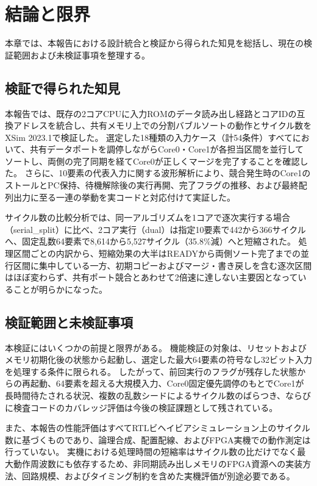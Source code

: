 \chapter{結論と限界}\label{chap:7}

本章では、本報告における設計統合と検証から得られた知見を総括し、現在の検証範囲および未検証事項を整理する。

\section{検証で得られた知見}\label{sec:7-1}

本報告では、既存の2コアCPUに入力ROMのデータ読み出し経路とコアIDの互換アドレスを統合し、共有メモリ上での分割バブルソートの動作とサイクル数をXSim 2023.1で検証した。
選定した18種類の入力ケース（計54条件）すべてにおいて、共有データポートを調停しながらCore0・Core1が各担当区間を並行してソートし、両側の完了同期を経てCore0が正しくマージを完了することを確認した。
さらに、10要素の代表入力に関する波形解析により、競合発生時のCore1のストールとPC保持、待機解除後の実行再開、完了フラグの推移、および最終配列出力に至る一連の挙動を実コードと対応付けて実証した。

サイクル数の比較分析では、同一アルゴリズムを1コアで逐次実行する場合（serial\_split）に比べ、2コア実行（dual）は指定10要素で442から366サイクルへ、固定乱数64要素で8,614から5,527サイクル（35.8\%減）へと短縮された。
処理区間ごとの内訳から、短縮効果の大半はREADYから両側ソート完了までの並行区間に集中している一方、初期コピーおよびマージ・書き戻しを含む逐次区間はほぼ変わらず、共有ポート競合とあわせて2倍速に達しない主要因となっていることが明らかになった。

\section{検証範囲と未検証事項}\label{sec:7-2}

本検証にはいくつかの前提と限界がある。
機能検証の対象は、リセットおよびメモリ初期化後の状態から起動し、選定した最大64要素の符号なし32ビット入力を処理する条件に限られる。
したがって、前回実行のフラグが残存した状態からの再起動、64要素を超える大規模入力、Core0固定優先調停のもとでCore1が長時間待たされる状況、複数の乱数シードによるサイクル数のばらつき、ならびに検査コードのカバレッジ評価は今後の検証課題として残されている。

また、本報告の性能評価はすべてRTLビヘイビアシミュレーション上のサイクル数に基づくものであり、論理合成、配置配線、およびFPGA実機での動作測定は行っていない。
実機における処理時間の短縮率はサイクル数の比だけでなく最大動作周波数にも依存するため、非同期読み出しメモリのFPGA資源への実装方法、回路規模、およびタイミング制約を含めた実機評価が別途必要である。
